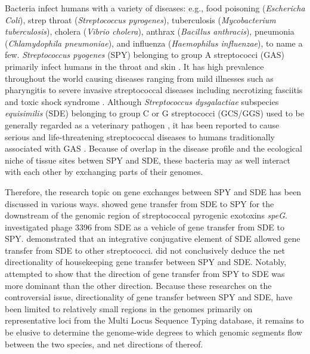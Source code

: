 \documentclass[english]{article}
\begin{document}
Bacteria infect humans with a variety of diseases: e.g., food poisoning
(\textit{Eschericha Coli}), strep throat (\textit{Streptococcus pyrogenes}),
tuberculosis (\textit{Mycobacterium tuberculosis}), cholera (\textit{Vibrio
cholera}), anthrax (\textit{Bacillus anthracis}), pneumonia
(\textit{Chlamydophila pneumoniae}), and influenza (\textit{Haemophilus
influenzae}), to name a few.  \textit{Streptococcus pyogenes} (SPY) belonging to
group A streptococci (GAS) primarily infect humans in the throat and skin
\citep{Broyles2009}. It has high prevalence throughout the world causing
diseases ranging from mild illnesses such as pharyngitis to severe invasive
streptococcal diseases including necrotizing fasciitis and toxic shock syndrome
\citep{Cunningham2000a}.  Although \textit{Streptococcus dysgalactiae}
subspecies \textit{equisimilis} (SDE) belonging to group C or G streptococci
(GCS/GGS) used to be generally regarded as a veterinary pathogen
\citep{Vandamme1996}, it has been reported to cause serious and life-threatening
streptococcal diseases to humans traditionally associated with GAS
\citep[e.g.,][]{Brandt2009}.  Because of overlap in the disease profile and the
ecological niche of tissue sites betwen SPY and SDE, these bacteria may as well
interact with each other by exchanging parts of their genomes.  

Therefore, the research topic on gene exchanges between SPY and SDE has been
discussed in various ways. \citet{Sachse2002} showed gene transfer from SDE to
SPY for the downstream of the genomic region of streptococcal pyrogenic
exotoxins \textit{speG}. \citet{Davies2007} investigated phage 3396 from SDE as
a vehicle of gene transfer from SDE to SPY. \citet{Davies2009} demonstrated that
an integrative conjugative element of SDE allowed gene transfer from SDE to
other streptococci.  \citet{Ahmad2009} did not conclusively deduce the net
directionality of housekeeping gene transfer between SPY and SDE.  Notably,
\citet{Kalia2001} attempted to show that the direction of gene transfer from SPY
to SDE was more dominant than the other direction.  Because these researches on
the controversial issue, directionality of gene transfer between SPY and SDE,
have been limited to relatively small regions in the genomes primarily on
representative loci from the Multi Locus Sequence Typing database, it remains to
be elusive to determine the genome-wide degrees to which genomic segments flow
between the two species, and net directions of thereof.
\end{document}
